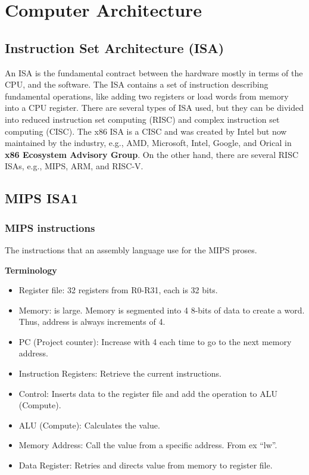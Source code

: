 \chapter{Computer Architecture}

\newpage


\section{Instruction Set Architecture (ISA)}
An ISA is the fundamental contract between the hardware mostly in terms of the CPU, and the software. The ISA contains a set of instruction describing fundamental operations, like adding two registers or load words from memory into a CPU register. There are several types of ISA used, but they can be divided into reduced instruction set computing (RISC) and complex instruction set computing (CISC). The x86 ISA is a CISC and was created by Intel but now maintained by the industry, e.g., AMD, Microsoft, Intel, Google, and Orical in \textbf{x86 Ecosystem Advisory Group}. On the other hand, there are several RISC ISAs, e.g., MIPS, ARM, and RISC-V.

\section{MIPS ISA1}
\subsection{MIPS instructions}
The instructions that an assembly language use for the MIPS proses.

\noindent\textbf{Terminology} \newline
\begin{itemize}
\item  Register file: 32 registers from R0-R31, each is 32 bits.
\item  Memory: is large. Memory is segmented into 4 8-bits of data to create a word. Thus, address is always increments of 4.
\item  PC (Project counter): Increase with 4 each time to go to the next memory address.
\item  Instruction Registers: Retrieve the current instructions.
\item  Control: Inserts data to the register file and add the operation to ALU (Compute).
\item  ALU (Compute): Calculates the value.
\item  Memory Address: Call the value from a specific address. From ex ``lw''.
\item  Data Register: Retries and directs value from memory to register file.
\end{itemize}

